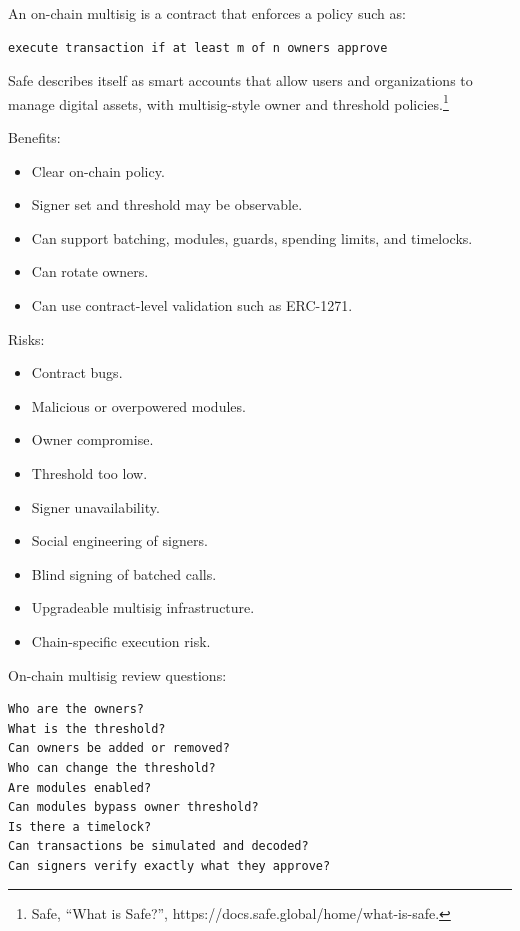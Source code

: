 An on-chain multisig is a contract that enforces a policy such as:

\begin{lstlisting}
execute transaction if at least m of n owners approve
\end{lstlisting}

Safe describes itself as smart accounts that allow users and
organizations to manage digital assets, with multisig-style owner and
threshold policies.\footnote{Safe, ``What is Safe?'',
  https://docs.safe.global/home/what-is-safe.}

Benefits:

\begin{itemize}
\tightlist
\item
  Clear on-chain policy.
\item
  Signer set and threshold may be observable.
\item
  Can support batching, modules, guards, spending limits, and timelocks.
\item
  Can rotate owners.
\item
  Can use contract-level validation such as ERC-1271.
\end{itemize}

Risks:

\begin{itemize}
\tightlist
\item
  Contract bugs.
\item
  Malicious or overpowered modules.
\item
  Owner compromise.
\item
  Threshold too low.
\item
  Signer unavailability.
\item
  Social engineering of signers.
\item
  Blind signing of batched calls.
\item
  Upgradeable multisig infrastructure.
\item
  Chain-specific execution risk.
\end{itemize}

On-chain multisig review questions:

\begin{lstlisting}
Who are the owners?
What is the threshold?
Can owners be added or removed?
Who can change the threshold?
Are modules enabled?
Can modules bypass owner threshold?
Is there a timelock?
Can transactions be simulated and decoded?
Can signers verify exactly what they approve?
\end{lstlisting}

